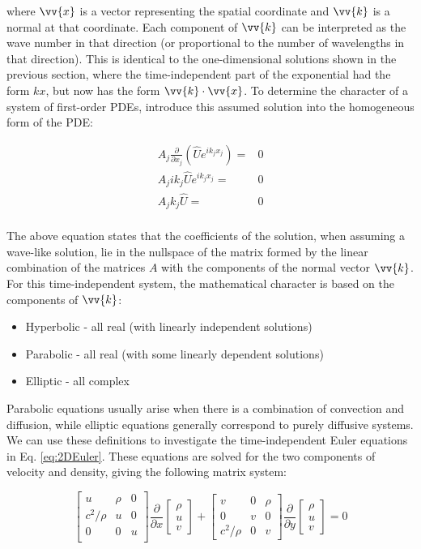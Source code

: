 \documentclass[10pt]{article}
\newcommand{\beq}{\begin{equation}}
\newcommand{\eeq}{\end{equation}}
\newcommand{\beqa}{\begin{equation}\begin{aligned}}
\newcommand{\eeqa}{\end{aligned}\end{equation}}
\begin{document}
\begin{flushleft}
where \(\vv{x}\) is a vector representing the spatial coordinate and \(\vv{k}\) is a normal at that coordinate. Each component of \(\vv{k}\) can be interpreted as the wave number in that direction (or proportional to the number of wavelengths in that direction). This is identical to the one-dimensional solutions shown in the previous section, where the time-independent part of the exponential had the form \(kx\), but now has the form \(\vv{k}\cdot\vv{x}\). To determine the character of a system of first-order PDEs, introduce this assumed solution into the homogeneous form of the PDE:

\beqa
\label{eq:Condition}
A_j\frac{\partial}{\partial x_j}\left(\hat{U}e^{ik_jx_j}\right)=&0\\
A_jik_j\hat{U}e^{ik_jx_j}=&0\\
A_jk_j\hat{U}=&0\\
\eeqa

The above equation states that the coefficients of the solution, when assuming a wave-like solution, lie in the nullspace of the matrix formed by the linear combination of the matrices \(A\) with the components of the normal vector \(\vv{k}\). For this time-independent system, the mathematical character is based on the components of \(\vv{k}\):

\begin{itemize}
\item Hyperbolic - all real (with linearly independent solutions)
\item Parabolic - all real (with some linearly dependent solutions)
\item Elliptic - all complex
\end{itemize}

Parabolic equations usually arise when there is a combination of convection and diffusion, while elliptic equations generally correspond to purely diffusive systems. We can use these definitions to investigate the time-independent Euler equations in Eq. \eqref{eq:2DEuler}. These equations are solved for the two components of velocity and density, giving the following matrix system:

\beq
\begin{bmatrix}
u & \rho & 0\\
c^2/\rho & u & 0\\
0 & 0 & u\\
\end{bmatrix}
\frac{\partial}{\partial x}\begin{bmatrix}\rho \\ u \\ v\end{bmatrix}+
\begin{bmatrix}
v & 0 & \rho\\
0 & v & 0\\
c^2/\rho & 0 & v
\end{bmatrix}
\frac{\partial}{\partial y}\begin{bmatrix}\rho \\ u \\ v\end{bmatrix}=0
\eeq


\end{flushleft}
\end{document}
